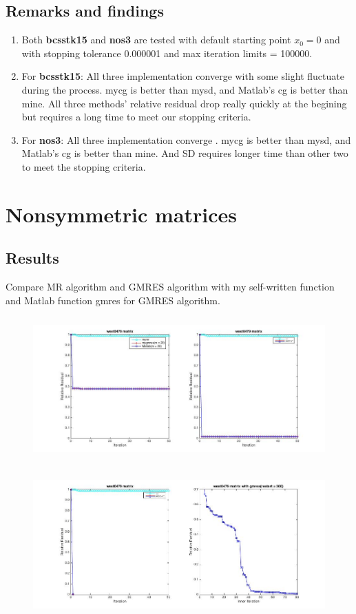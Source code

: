 \documentclass[fleqn]{article}
\begin{document}
\subsection{Remarks and findings}
   \begin{enumerate}
       \item Both \textbf{bcsstk15} and \textbf{nos3} are tested with default starting point $x_0 = 0$ and with stopping tolerance 0.000001 and max iteration limits = 100000.
       \item For \textbf{bcsstk15}: All three implementation converge with some slight fluctuate during the process. mycg is better than mysd, and Matlab's cg is better than mine. All three methods' relative residual drop really quickly at the begining but requires a long time to meet our stopping criteria.
       \item For \textbf{nos3}:  All three implementation converge . mycg is better than mysd, and Matlab's cg is better than mine. And SD requires longer time than other two to meet the stopping criteria. 
      
   \end{enumerate}

\section{Nonsymmetric matrices}
\subsection{Results}
  Compare MR algorithm and GMRES algorithm with my self-written function and Matlab function gmres for GMRES algorithm.\\[1ex] 

\begin{figure}[h]
\centering
\includegraphics[width = \textwidth, height = 5.5cm]{west31.jpg}
\end{figure}
\begin{figure}[h]
\centering
\includegraphics[width = \textwidth, height = 5.5cm]{west32.jpg}
\end{figure}
\end{document}
